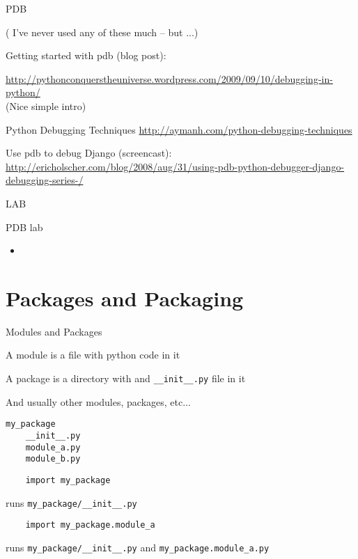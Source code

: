 \documentclass{beamer}
\begin{document}
\begin{frame}[fragile]{PDB}

( I've never used any of these much -- but ...)

\vfill
{\Large Getting started with pdb (blog post):}

\url{http://pythonconquerstheuniverse.wordpress.com/2009/09/10/debugging-in-python/}\\
(Nice simple intro)

\vfill
{\Large Python Debugging Techniques}
\url{http://aymanh.com/python-debugging-techniques}

\vfill
{\Large Use pdb to debug Django (screencast):}
\url{http://ericholscher.com/blog/2008/aug/31/using-pdb-python-debugger-django-debugging-series-/}

\end{frame} 




\begin{frame}{LAB}

{\Large PDB lab}

\begin{itemize}
  \item
\end{itemize}

\end{frame}


\section{Packages and Packaging}

\begin{frame}[fragile]{Modules and Packages}

\vfill
{\Large A module is a file with python code in it}

\vfill
{\Large A package is a directory with and \verb|__init__.py| file in it}

\vfill
{\Large And usually other modules, packages, etc...}

\begin{verbatim}
my_package
    __init__.py
    module_a.py
    module_b.py
\end{verbatim}

\begin{verbatim}
    import my_package
\end{verbatim}

runs \verb|my_package/__init__.py|

\begin{verbatim}
    import my_package.module_a
\end{verbatim}

runs \verb|my_package/__init__.py| and \verb|my_package.module_a.py|

\end{frame} 
\end{document}
